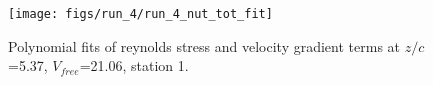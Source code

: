\begin{figure}[H]
\centering
\texttt{[image: figs/run\_4/run\_4\_nut\_tot\_fit]}
\caption{Polynomial fits of reynolds stress and velocity gradient terms at $z/c$=5.37, $V_{free}$=21.06, station 1.}
\label{fig:run_4_nut_tot_fit}
\end{figure}


